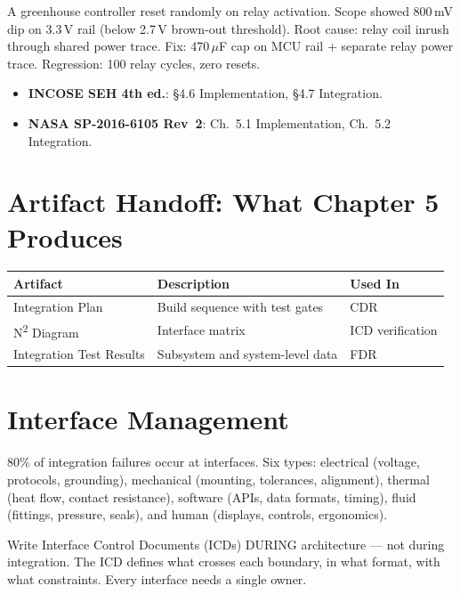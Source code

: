 \documentclass[11pt,letterpaper,twoside,openany]{book}
\begin{document}
\begin{tipbox}
A greenhouse controller reset randomly on relay activation. Scope showed 800\,mV dip on 3.3\,V rail (below 2.7\,V brown-out threshold). Root cause: relay coil inrush through shared power trace. Fix: 470\,$\mu$F cap on MCU rail + separate relay power trace. Regression: 100 relay cycles, zero resets.
\end{tipbox}

\begin{keyconceptbox}
\begin{itemize}[nosep,leftmargin=1.5em]
\item \textbf{INCOSE SEH 4th ed.}: \S4.6 Implementation, \S4.7 Integration.
\item \textbf{NASA SP-2016-6105 Rev~2}: Ch.~5.1 Implementation, Ch.~5.2 Integration.
\end{itemize}
\end{keyconceptbox}

\section{Artifact Handoff: What Chapter 5 Produces}
\begin{table}[htbp]\centering\small
\begin{tabularx}{\textwidth}{l X l}
\toprule
\textbf{Artifact} & \textbf{Description} & \textbf{Used In} \\
\midrule
Integration Plan & Build sequence with test gates & CDR \\
N\textsuperscript{2} Diagram & Interface matrix & ICD verification \\
Integration Test Results & Subsystem and system-level data & FDR \\
\bottomrule
\end{tabularx}
\end{table}

\section{Interface Management}
80\% of integration failures occur at interfaces. Six types: electrical (voltage, protocols, grounding), mechanical (mounting, tolerances, alignment), thermal (heat flow, contact resistance), software (APIs, data formats, timing), fluid (fittings, pressure, seals), and human (displays, controls, ergonomics).

Write Interface Control Documents (ICDs) DURING architecture — not during integration. The ICD defines what crosses each boundary, in what format, with what constraints. Every interface needs a single owner.
\end{document}
